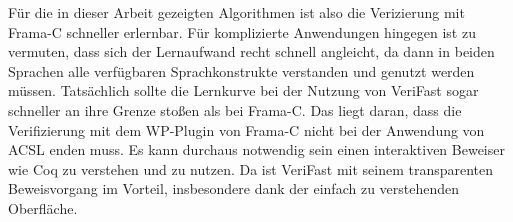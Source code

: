 Für die in dieser Arbeit gezeigten Algorithmen ist also die Verizierung mit Frama-C schneller erlernbar. Für komplizierte
Anwendungen hingegen ist zu vermuten, dass sich der Lernaufwand recht schnell angleicht, da dann in beiden Sprachen
alle verfügbaren Sprachkonstrukte verstanden und genutzt werden müssen. Tatsächlich sollte die Lernkurve bei der Nutzung
von VeriFast sogar schneller an ihre Grenze stoßen als bei Frama-C. Das liegt daran, dass die Verifizierung mit dem WP-Plugin
von Frama-C nicht bei der Anwendung von ACSL enden muss. Es kann durchaus notwendig sein einen interaktiven Beweiser wie Coq
zu verstehen und zu nutzen. Da ist VeriFast mit seinem transparenten Beweisvorgang im Vorteil, insbesondere
dank der einfach zu verstehenden Oberfläche.
